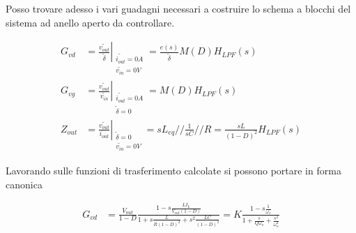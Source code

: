 \documentclass{article}
\begin{document}
\newpage
\noindent
Posso trovare adesso i vari guadagni necessari a costruire lo schema a blocchi del sistema ad anello aperto da controllare.

\vspace{0.5em}
\begin{align*}
    G_{vd} &= \left. \frac{\tilde{v_{out}}}{\tilde{\delta}} \right|_{\substack{ \tilde{i_{out}} = 0A \\ \tilde{v_{in}} = 0V }} = \frac{e(s)}{\tilde{\delta}} M(D) H_{LPF}(s) \\
    G_{vg} &= \left. \frac{\tilde{v_{out}}}{\tilde{v_{in}}} \right|_{\substack{ \tilde{i_{out}} = 0A \\ \tilde{\delta} = 0 }} = M(D) H_{LPF}(s) \\
    Z_{out} &= \left. \frac{\tilde{v_{out}}}{i_{out}} \right|_{\substack{ \tilde{\delta} = 0 \\ \tilde{v_{in}} = 0V }} = sL_{eq} //\frac{1}{sC}//R = \frac{sL}{(1-D)^2} H_{LPF}(s)
\end{align*}
\vspace{0.5em}

\newpage
\noindent
Lavorando sulle funzioni di trasferimento calcolate si possono portare in forma canonica

\vspace{0.5em}
\begin{align*}
    G_{vd} &= \frac{V_{out}}{1-D} \frac{1-s\frac{LI_L}{V_{out}(1-D)}}{1+s\frac{L}{R(1-D)^2} +s^2 \frac{LC}{(1-D)^2}} = K \frac{1-s\frac{1}{\omega_z}}{1+\frac{s}{Q \omega_o} + \frac{s^2}{\omega_o^2}}
\end{align*}
\vspace{0.5em}
\end{document}
